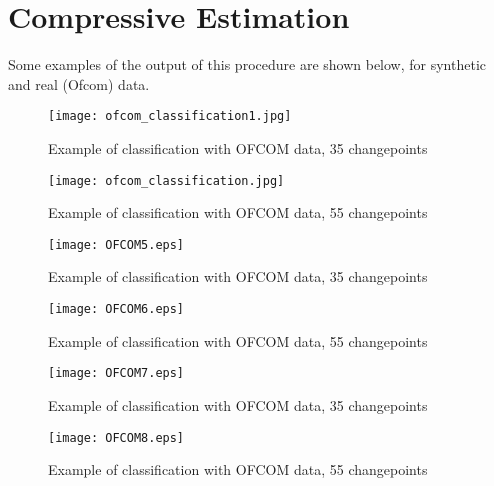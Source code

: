 \section{Compressive Estimation}

Some examples of the output of this procedure are shown below, for synthetic and real (Ofcom) data.

\begin{figure}[h]
\centering
\texttt{[image: ofcom\_classification1.jpg]}
\caption{Example of classification with OFCOM data, 35 changepoints}
\label{fig:hvb}
\end{figure}

\begin{figure}[h]
\centering
\texttt{[image: ofcom\_classification.jpg]}
\caption{Example of classification with OFCOM data, 55 changepoints}
\label{fig:hvb}
\end{figure}

\begin{figure}[h]
\centering
\texttt{[image: OFCOM5.eps]}
\caption{Example of classification with OFCOM data, 35 changepoints}
\label{fig:hvb}
\end{figure}

\begin{figure}[h]
\centering
\texttt{[image: OFCOM6.eps]}
\caption{Example of classification with OFCOM data, 55 changepoints}
\label{fig:hvb}
\end{figure}

\begin{figure}[h]
\centering
\texttt{[image: OFCOM7.eps]}
\caption{Example of classification with OFCOM data, 35 changepoints}
\label{fig:hvb}
\end{figure}

\begin{figure}[h]
\centering
\texttt{[image: OFCOM8.eps]}
\caption{Example of classification with OFCOM data, 55 changepoints}
\label{fig:hvb}
\end{figure}
